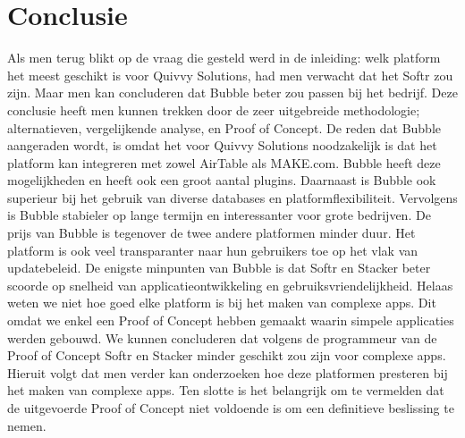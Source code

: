 
\chapter{Conclusie}%
\label{ch:conclusie}

Als men terug blikt op de vraag die gesteld werd in de inleiding: welk platform het meest geschikt is voor Quivvy Solutions, had men verwacht dat het Softr zou zijn. Maar men kan concluderen dat Bubble beter zou passen bij het bedrijf. 
Deze conclusie heeft men kunnen trekken door de zeer uitgebreide methodologie; alternatieven, vergelijkende analyse, en Proof of Concept. De reden dat Bubble aangeraden wordt, is omdat het voor Quivvy Solutions noodzakelijk is dat het platform
kan integreren met zowel AirTable als MAKE.com. Bubble heeft deze mogelijkheden en heeft ook een groot aantal plugins. Daarnaast is Bubble ook superieur bij het gebruik van diverse databases en platformflexibiliteit.
Vervolgens is Bubble stabieler op lange termijn en interessanter voor grote bedrijven. De prijs van Bubble is tegenover de twee andere platformen minder duur. Het platform is ook veel transparanter naar hun 
gebruikers toe op het vlak van updatebeleid. De enigste minpunten van Bubble is dat Softr en Stacker beter scoorde op snelheid van applicatieontwikkeling en gebruiksvriendelijkheid. Helaas weten we niet hoe goed elke platform is bij het maken
van complexe apps. Dit omdat we enkel een Proof of Concept hebben gemaakt waarin simpele applicaties werden gebouwd. We kunnen concluderen dat volgens de programmeur van de Proof of Concept Softr en Stacker minder geschikt zou zijn voor complexe apps. Hieruit volgt dat men verder kan onderzoeken 
hoe deze platformen presteren bij het maken van complexe apps. Ten slotte is het belangrijk om te vermelden dat de uitgevoerde Proof of Concept niet voldoende is om een definitieve beslissing te nemen.



